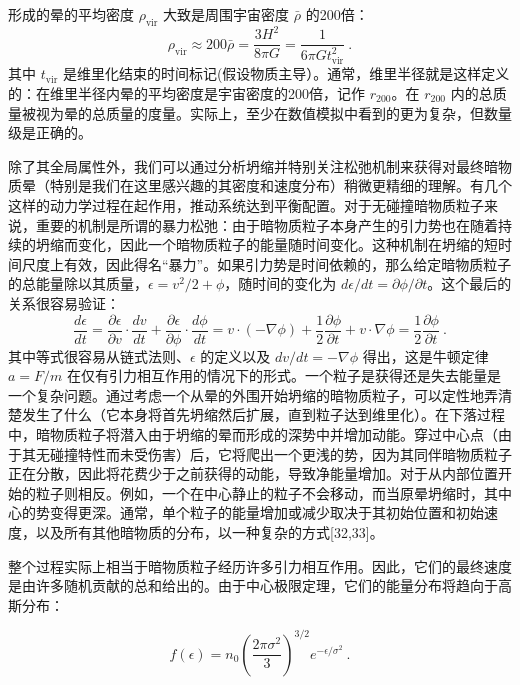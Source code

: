 形成的晕的平均密度 \(\rho_{\text{vir}}\) 大致是周围宇宙密度 \(\bar{\rho}\) 的200倍：
\begin{equation}
\rho_{\text{vir}} \approx 200 \bar{\rho} = \frac{3H^2}{8\pi G} = \frac{1}{6\pi G t^2_{\text{vir}}}~. 
\end{equation}
其中 \(t_{\text{vir}}\) 是维里化结束的时间标记(假设物质主导）。通常，维里半径就是这样定义的：在维里半径内晕的平均密度是宇宙密度的200倍，记作 \(r_{200}\)。在 \(r_{200}\) 内的总质量被视为晕的总质量的度量。实际上，至少在数值模拟中看到的更为复杂，但数量级是正确的。

除了其全局属性外，我们可以通过分析坍缩并特别关注松弛机制来获得对最终暗物质晕（特别是我们在这里感兴趣的其密度和速度分布）稍微更精细的理解。有几个这样的动力学过程在起作用，推动系统达到平衡配置。对于无碰撞暗物质粒子来说，重要的机制是所谓的暴力松弛：由于暗物质粒子本身产生的引力势也在随着持续的坍缩而变化，因此一个暗物质粒子的能量随时间变化。这种机制在坍缩的短时间尺度上有效，因此得名“暴力”。如果引力势是时间依赖的，那么给定暗物质粒子的总能量除以其质量，\(\epsilon = v^2/2 + \phi\)，随时间的变化为 \(d\epsilon/dt = \partial\phi/\partial t\)。这个最后的关系很容易验证：
\begin{equation}
\frac{d\epsilon}{dt} = \frac{\partial\epsilon}{\partial v} \cdot \frac{dv}{dt} + \frac{\partial\epsilon}{\partial\phi} \cdot \frac{d\phi}{dt} = v \cdot (-\nabla\phi) + \frac{1}{2} \frac{\partial\phi}{\partial t} + v \cdot \nabla\phi = \frac{1}{2} \frac{\partial\phi}{\partial t}~. 
\end{equation}
其中等式很容易从链式法则、\(\epsilon\) 的定义以及 \(dv/dt = -\nabla\phi\) 得出，这是牛顿定律 \(a = F/m\) 在仅有引力相互作用的情况下的形式。一个粒子是获得还是失去能量是一个复杂问题。通过考虑一个从晕的外围开始坍缩的暗物质粒子，可以定性地弄清楚发生了什么（它本身将首先坍缩然后扩展，直到粒子达到维里化）。在下落过程中，暗物质粒子将潜入由于坍缩的晕而形成的深势中并增加动能。穿过中心点（由于其无碰撞特性而未受伤害）后，它将爬出一个更浅的势，因为其同伴暗物质粒子正在分散，因此将花费少于之前获得的动能，导致净能量增加。对于从内部位置开始的粒子则相反。例如，一个在中心静止的粒子不会移动，而当原晕坍缩时，其中心的势变得更深。通常，单个粒子的能量增加或减少取决于其初始位置和初始速度，以及所有其他暗物质的分布，以一种复杂的方式[32,33]。

整个过程实际上相当于暗物质粒子经历许多引力相互作用。因此，它们的最终速度是由许多随机贡献的总和给出的。由于中心极限定理，它们的能量分布将趋向于高斯分布：

\[ f(\epsilon) = n_0 \left(\frac{2\pi\sigma^2}{3}\right)^{3/2} e^{-\epsilon/\sigma^2} ~. \]

